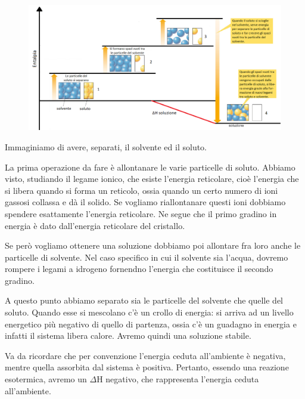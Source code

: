 \begin{figure}[htp]
    \centering
    \includegraphics[width=15cm]{immagini/processo_di_soluzione.png}
\end{figure}

Immaginiamo di avere, separati, il solvente ed il soluto.

La prima operazione da fare è allontanare le varie particelle di soluto. Abbiamo visto, studiando il legame ionico, che esiste l'energia reticolare, cioè l'energia che si libera quando si forma un reticolo, ossia quando un certo numero di ioni gassosi collassa e dà il solido. Se vogliamo riallontanare questi ioni dobbiamo spendere esattamente l'energia reticolare. Ne segue che il primo gradino in energia è dato dall'energia reticolare del cristallo.

Se però vogliamo ottenere una soluzione dobbiamo poi allontare fra loro anche le particelle di solvente. Nel caso specifico in cui il solvente sia l'acqua, dovremo rompere i legami a idrogeno fornendno l'energia che costituisce il secondo gradino.

A questo punto abbiamo separato sia le particelle del solvente che quelle del soluto. Quando esse si mescolano c'è un crollo di energia: si arriva ad un livello energetico più negativo di quello di partenza, ossia c'è un guadagno in energia e infatti il sistema libera calore. Avremo quindi una soluzione stabile.

Va da ricordare che per convenzione l'energia ceduta all'ambiente è negativa, mentre quella assorbita dal sistema è positiva. Pertanto, essendo una reazione esotermica, avremo un $\Delta$H negativo, che rappresenta l'energia ceduta all'ambiente.
